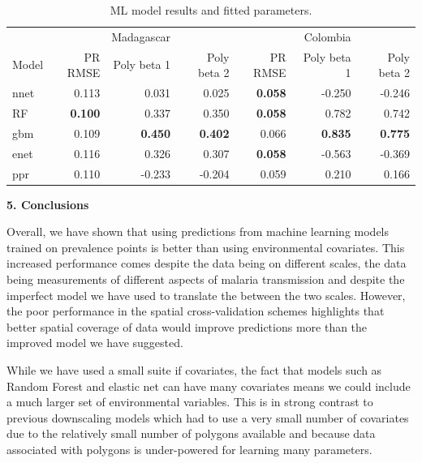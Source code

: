 \documentclass[11pt]{article}
\begin{document}
\begin{table}
\caption{ML model results and fitted parameters. }
\centering
\begin{tabular}{l|rrr|rrr}
               &&      Madagascar &&      &                                     Colombia&    \\
Model          & PR RMSE & Poly beta 1 & Poly beta 2 & PR RMSE & Poly beta 1  & Poly beta 2\\
\hline
nnet           & 0.113      &  0.031         &  0.025         & \textbf{0.058}& -0.250          & -0.246          \\
RF   &  \textbf{0.100}      &  0.337         &  0.350         & \textbf{0.058}&  0.782          &  0.742          \\
gbm            & 0.109      &  \textbf{0.450}&  \textbf{0.402}& 0.066         &  \textbf{0.835} &  \textbf{0.775} \\
enet           & 0.116      &  0.326         &  0.307         & \textbf{0.058}& -0.563          & -0.369          \\
ppr            & 0.110      & -0.233         & -0.204         & 0.059         &  0.210          &  0.166          \\
\end{tabular}
\label{t:mlresults}
\end{table}




{\bf 5. Conclusions}

Overall, we have shown that using predictions from machine learning models trained on prevalence points is better than using environmental covariates.
This increased performance comes despite the data being on different scales, the data being measurements of different aspects of malaria transmission and despite the imperfect model we have used to translate the between the two scales.
However, the poor performance in the spatial cross-validation schemes highlights that better spatial coverage of data would improve predictions more than the improved model we have suggested.

While we have used a small suite if covariates, the fact that models such as Random Forest and elastic net can have many covariates means we could include a much larger set of environmental variables.
This is in strong contrast to previous downscaling models which had to use a very small number of covariates due to the relatively small number of polygons available and because data associated with polygons is under-powered for learning many parameters.
\end{document}
